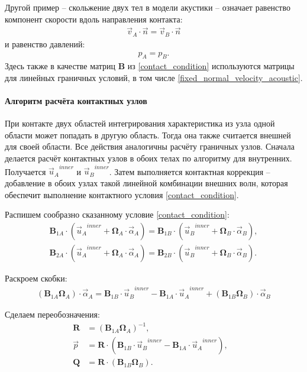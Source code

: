 Другой пример -- скольжение двух тел в модели акустики -- 
означает равенство компонент скорости вдоль направления контакта:
\begin{eqnarray}
\vec{v}_A \cdot \vec{n} = \vec{v}_B \cdot \vec{n}
\end{eqnarray}
и равенство давлений:
\begin{eqnarray}
p_A = p_B.
\end{eqnarray}
Здесь также в качестве матриц $\mathbf{B}$ из \eqref{contact_condition} 
используются матрицы для линейных граничных условий, в том числе 
\eqref{fixed_normal_velocity_acoustic}.


\paragraph{Алгоритм расчёта контактных узлов}
\label{sec:good-contact-case}
При контакте двух областей интегрирования характеристика из узла
одной области может попадать в другую область. Тогда она также считается
внешней для своей области. 
Все действия аналогичны расчёту граничных узлов. 
Сначала делается расчёт контактных узлов в обоих телах по алгоритму для внутренних.
Получается ${\vec{u}_A}^{inner}$ и ${\vec{u}_B}^{inner}$. 
Затем выполняется контактная коррекция -- 
добавление в обоих узлах такой линейной комбинации внешних волн, 
которая обеспечит выполнение контактного условия \eqref{contact_condition}. 

Распишем сообразно сказанному условие \eqref{contact_condition}:
\begin{eqnarray}
	\mathbf{B}_{1A} \cdot ({\vec{u}_A}^{inner} + \mathbf{\Omega}_A \cdot \vec{\alpha}_A) = \mathbf{B}_{1B} \cdot ({\vec{u}_B}^{inner} + \mathbf{\Omega}_B \cdot \vec{\alpha}_B), \\
\label{second_line_in_contact_condition_wide}
	\mathbf{B}_{2A} \cdot ({\vec{u}_A}^{inner} + \mathbf{\Omega}_A \cdot \vec{\alpha}_A) = \mathbf{B}_{2B} \cdot ({\vec{u}_B}^{inner} + \mathbf{\Omega}_B \cdot \vec{\alpha}_B).
\end{eqnarray}

Раскроем скобки:
\begin{eqnarray}
	(\mathbf{B}_{1A} \mathbf{\Omega}_A) \cdot  \vec{\alpha}_A = \mathbf{B}_{1B} \cdot {\vec{u}_B}^{inner} - \mathbf{B}_{1A} \cdot {\vec{u}_A}^{inner} + (\mathbf{B}_{1B} \mathbf{\Omega}_B) \cdot \vec{\alpha}_B
\end{eqnarray}

Сделаем переобозначения:
\begin{align}
\label{matrixRcontact}
\mathbf{R} &= (\mathbf{B}_{1A} \mathbf{\Omega}_A)^{-1}, &\\
\vec{p} &= \mathbf{R} \cdot (\mathbf{B}_{1B} \cdot {\vec{u}_B}^{inner} - \mathbf{B}_{1A} \cdot {\vec{u}_A}^{inner}), &\\
\mathbf{Q} &= \mathbf{R} \cdot (\mathbf{B}_{1B} \mathbf{\Omega}_B).
\end{align}

